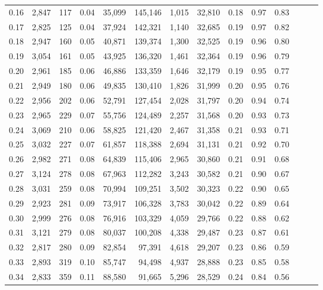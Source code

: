 \begin{tabular}{rrrrrrrrrrrrrr}
0.16 &  2,847 &  117 &  0.04 &   35,099 &  145,146 &   1,015 &  32,810 &  0.18 &  0.97 &      0.83 \\
0.17 &  2,825 &  125 &  0.04 &   37,924 &  142,321 &   1,140 &  32,685 &  0.19 &  0.97 &      0.82 \\
0.18 &  2,947 &  160 &  0.05 &   40,871 &  139,374 &   1,300 &  32,525 &  0.19 &  0.96 &      0.80 \\
0.19 &  3,054 &  161 &  0.05 &   43,925 &  136,320 &   1,461 &  32,364 &  0.19 &  0.96 &      0.79 \\
0.20 &  2,961 &  185 &  0.06 &   46,886 &  133,359 &   1,646 &  32,179 &  0.19 &  0.95 &      0.77 \\
0.21 &  2,949 &  180 &  0.06 &   49,835 &  130,410 &   1,826 &  31,999 &  0.20 &  0.95 &      0.76 \\
0.22 &  2,956 &  202 &  0.06 &   52,791 &  127,454 &   2,028 &  31,797 &  0.20 &  0.94 &      0.74 \\
0.23 &  2,965 &  229 &  0.07 &   55,756 &  124,489 &   2,257 &  31,568 &  0.20 &  0.93 &      0.73 \\
0.24 &  3,069 &  210 &  0.06 &   58,825 &  121,420 &   2,467 &  31,358 &  0.21 &  0.93 &      0.71 \\
0.25 &  3,032 &  227 &  0.07 &   61,857 &  118,388 &   2,694 &  31,131 &  0.21 &  0.92 &      0.70 \\
0.26 &  2,982 &  271 &  0.08 &   64,839 &  115,406 &   2,965 &  30,860 &  0.21 &  0.91 &      0.68 \\
0.27 &  3,124 &  278 &  0.08 &   67,963 &  112,282 &   3,243 &  30,582 &  0.21 &  0.90 &      0.67 \\
0.28 &  3,031 &  259 &  0.08 &   70,994 &  109,251 &   3,502 &  30,323 &  0.22 &  0.90 &      0.65 \\
0.29 &  2,923 &  281 &  0.09 &   73,917 &  106,328 &   3,783 &  30,042 &  0.22 &  0.89 &      0.64 \\
0.30 &  2,999 &  276 &  0.08 &   76,916 &  103,329 &   4,059 &  29,766 &  0.22 &  0.88 &      0.62 \\
0.31 &  3,121 &  279 &  0.08 &   80,037 &  100,208 &   4,338 &  29,487 &  0.23 &  0.87 &      0.61 \\
0.32 &  2,817 &  280 &  0.09 &   82,854 &   97,391 &   4,618 &  29,207 &  0.23 &  0.86 &      0.59 \\
0.33 &  2,893 &  319 &  0.10 &   85,747 &   94,498 &   4,937 &  28,888 &  0.23 &  0.85 &      0.58 \\
0.34 &  2,833 &  359 &  0.11 &   88,580 &   91,665 &   5,296 &  28,529 &  0.24 &  0.84 &      0.56 \\

\end{tabular}
